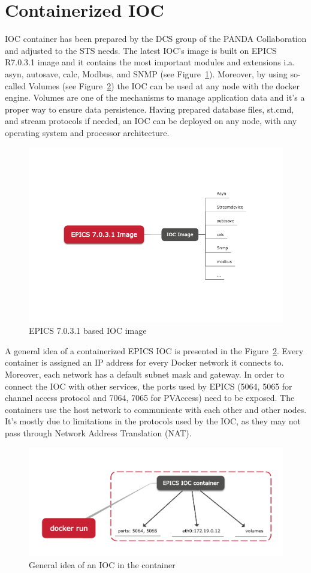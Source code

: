\section{Containerized IOC}
IOC container has been prepared by the \gls{DCS} group of the \gls{PANDA} Collaboration and adjusted to the \gls{STS} needs. The latest \gls{IOC}'s image is built on EPICS R7.0.3.1 image and it contains the most important modules and extensions i.a. asyn, autosave, calc, Modbus, and SNMP (see Figure~\ref{fig_ioc1}). Moreover, by using so-called Volumes (see Figure~\ref{fig_doc}) the \gls{IOC} can be used at any node with the docker engine. Volumes are one of the mechanisms to manage application data and it's a proper way to ensure data persistence. Having prepared database files, st.cmd, and stream protocols if needed, an \gls{IOC} can be deployed on any node, with any operating system and processor architecture.
\begin{figure}[!h]
\centering
\includegraphics[width=0.65\columnwidth]{Chapter4/images/epics_ioc.png}
\caption{EPICS 7.0.3.1 based \gls{IOC} image}
\label{fig_ioc1}
\end{figure}
A general idea of a containerized \gls{EPICS} \gls{IOC} is presented in the Figure~\ref{fig_doc}. Every container is assigned an IP address for every Docker network it connects to. Moreover, each network has a default subnet mask and gateway. In order to connect the \gls{IOC} with other services, the ports used by \gls{EPICS} (5064, 5065 for channel access protocol and 7064, 7065 for PVAccess) need to be exposed.  The containers use the host network to communicate with each other and other nodes. It's mostly due to limitations in the protocols used by the \gls{IOC}, as they may not pass through Network Address Translation (NAT).
\begin{figure}[!h]
\centering
\includegraphics[width=0.7\columnwidth]{Chapter4/images/docker_run.png}
\caption{General idea of an \gls{IOC} in the container}
\label{fig_doc}
\end{figure}

